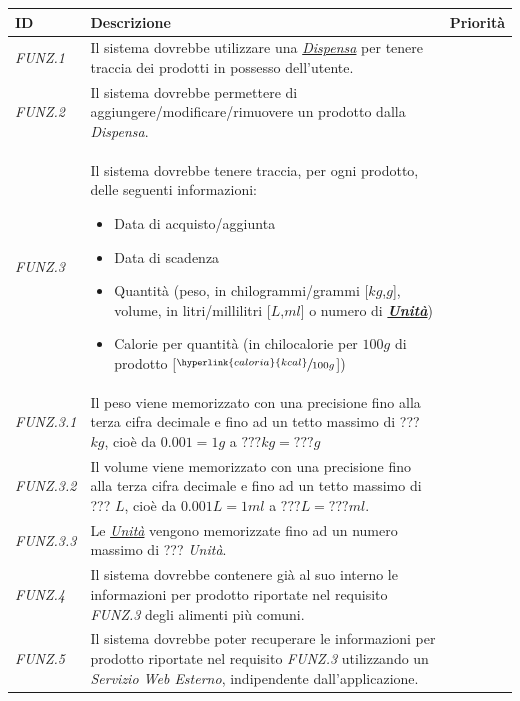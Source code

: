 \documentclass{article}
\newcommand{\must}{\cellcolor{Green}{M}}
\newcommand{\should}{\cellcolor{LimeGreen}{S}}
\newcommand{\wont}{\cellcolor{BrickRed}{W}}
\begin{document}
\begin{center}
    \begin{longtable}{p{50pt}p{250pt}c}
    \toprule
        ID & Descrizione & Priorità \\
        \midrule
         \textit{FUNZ.1} & Il sistema dovrebbe utilizzare una \textit{\hyperlink{dispensa}{Dispensa}} per tenere traccia dei prodotti in possesso dell'utente. & \must  \\
         \textit{FUNZ.2} & Il sistema dovrebbe permettere di aggiungere/modificare/rimuovere un prodotto dalla \textit{Dispensa}. & \must \\
         \textit{FUNZ.3} & Il sistema dovrebbe tenere traccia, per ogni prodotto, delle seguenti informazioni:
         \begin{itemize}
             \item Data di acquisto/aggiunta
             \item Data di scadenza
             \item Quantità (peso, in chilogrammi/grammi [$kg$,$g$], volume, in litri/millilitri [$L$,$ml$] o numero di \textbf{\textit{\hyperlink{unità}{Unità}}})
             \item Calorie per quantità (in chilocalorie per $100g$ di prodotto [$\sfrac{\hyperlink{caloria}{kcal}}{100g}$])
         \end{itemize}& \must \\
         \textit{FUNZ.3.1} & Il peso viene memorizzato con una precisione fino alla terza cifra decimale e fino ad un tetto massimo di ??? $kg$, cioè da $0.001 = 1 g$ a $??? kg = ???g$ & \must\\
         \textit{FUNZ.3.2} & Il volume viene memorizzato con una precisione fino alla terza cifra decimale e fino ad un tetto massimo di ??? $L$, cioè da $0.001 L = 1 ml$ a $??? L = ???ml$.& \must \\
         \textit{FUNZ.3.3} & Le \textit{\hyperlink{unità}{Unità}} vengono memorizzate fino ad un numero massimo di ??? \textit{Unità}. &\must \\
         \textit{FUNZ.4} & Il sistema dovrebbe contenere già al suo interno le informazioni per prodotto riportate nel requisito \textit{FUNZ.3} degli alimenti più comuni.  & \should \\
         \textit{FUNZ.5} & Il sistema dovrebbe poter recuperare le informazioni per prodotto riportate nel requisito \textit{FUNZ.3} utilizzando un \textit{Servizio Web Esterno}, indipendente dall'applicazione. & \wont  \\

\end{longtable}
\end{center}
\end{document}
